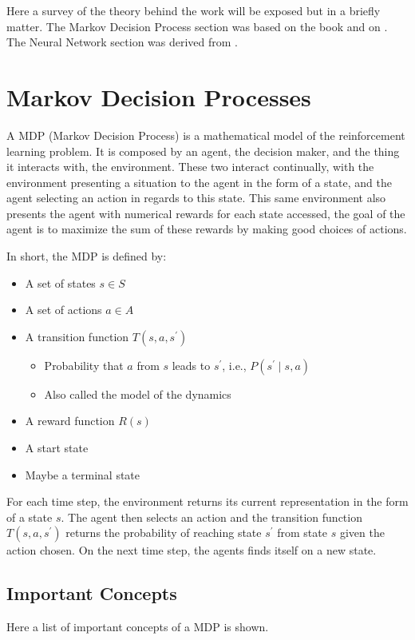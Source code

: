Here a survey of the theory behind the work will be exposed but in a briefly matter. The Markov Decision Process section was based on  the book \cite{RFIntroduction} and on \cite{UCBerkley}. The Neural Network section was derived from \cite{NNs}.

\section{Markov Decision Processes}


\renewcommand{\vec}[1]{\mathbf{#1}}

A MDP (Markov Decision Process) is a mathematical model of the reinforcement learning problem. It is composed by an agent, the decision maker, and the thing it interacts with, the environment. These two interact continually, with the environment presenting a situation to the agent in the form of a state, and the agent selecting an action in regards to this state. This same environment also presents the agent with numerical rewards for each state accessed, the goal of the agent is to maximize the sum of these rewards by making good choices of actions.

In short, the MDP is defined by:
\begin{itemize}
	\item A set of states $ s \in S $
	\item A set of actions $ a \in A $
	\item A transition function $ T\left(s, a, s^\prime\right) $
	\begin{itemize}
		\item Probability that $a$ from $s$ leads to $s^\prime$, i.e., $P\left(s^\prime\mid s, a\right) $
		\item Also called the model of the dynamics
	\end{itemize}
	\item A reward function $R\left(s\right)$
	\item A start state
	\item Maybe a terminal state
\end{itemize}

For each time step, the environment returns its current representation in the form  of a state $s$. The agent then selects an action and the transition function $ T\left(s, a, s^\prime\right) $ returns the probability of reaching state $s^\prime$ from state $s$ given the action chosen. On the next time step, the agents finds itself on a new state.

\subsection{Important Concepts}
Here a list of important concepts of a MDP is shown.
